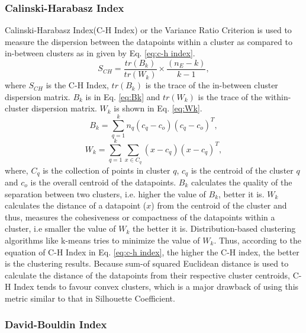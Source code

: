 \subsubsection{Calinski-Harabasz Index}

Calinski-Harabasz Index(C-H Index) or the Variance Ratio Criterion is used to measure the dispersion between the datapoints within a cluster as compared to in-between clusters as in given by Eq. \ref{eq:c-h index}.
\begin{equation}
  \label{eq:c-h index}
  \mathit{S_{CH}}= \mathit{\frac{tr(B_{k})}{tr(W_{k})}} \times \mathit{\frac{(n_{E}-k)}{k-1}},
\end{equation}
where $S_{CH}$ is the C-H Index, $tr(B_{k})$ is the trace of the in-between cluster dispersion matrix. $B_{k}$ is in Eq. \ref{eq:Bk}  and $tr(W_{k})$ is the trace of the within-cluster dispersion matrix. $W_{k}$ is shown in Eq. \ref{eq:Wk}.
\begin{equation}
  \label{eq:Bk}
  \mathit{B_{k}}= \mathit{\sum_{q=1}^{k}n_{q}(c_{q}-c_{o})(c_{q}-c_{o})^T}, 
\end{equation}
\begin{equation}
  \label{eq:Wk}
  \mathit{W_{k}}= \mathit{\sum_{q=1}^{k}\sum_{x \in C_{q}}(x-c_{q})(x-c_{q})^T}, 
\end{equation}
where, $C_q$ is the collection of points in cluster $q$, $c_{q}$ is the centroid of the cluster $q$ and $c_{o}$ is the overall centroid of the datapoints. $B_{k}$ calculates the quality of the separation between two clusters, i.e. higher the value of $B_{k}$, better it is. $W_{k}$ calculates the distance of a datapoint ($x$) from the centroid of the cluster and thus, measures the cohesiveness or compactness of the datapoints within a cluster, i.e smaller the value of $W_{k}$ the better it is. Distribution-based clustering algorithms like k-means tries to minimize the value of $W_{k}$. Thus, according to the equation of C-H Index in Eq. \ref{eq:c-h index}, the higher the C-H index, the better is the clustering results. Because sum-of squared Euclidean distance is used to calculate the distance of the datapoints from their respective cluster centroids, C-H Index tends to favour convex clusters, which is a major drawback of using this metric similar to that in Silhouette Coefficient.\cite{chindex}

\subsubsection{David-Bouldin Index}

